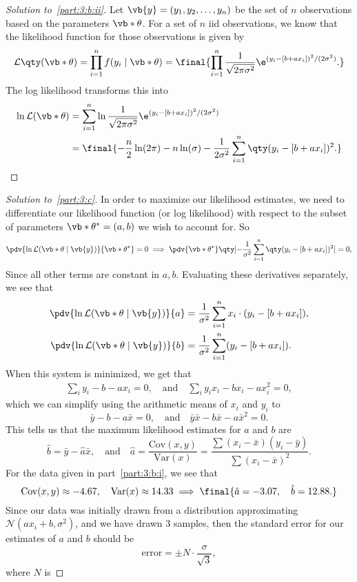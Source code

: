 \documentclass[10pt, physics]{homework}
\begin{document}
	\begin{proof}[Solution to~\ref{part:3:b:ii}]
		Let $\vb{y} = (y_1,y_2,\dots,y_n)$ be the set of $n$ observations based on the parameters $\vb*{\theta}$.
		For a set of $n$ iid observations, we know that the likelihood function for those observations is given by
		\[ \mathcal{L}\qty(\vb*{\theta}) = \prod_{i = 1}^n f(y_i \mid \vb*{\theta}) = \final{\prod_{i = 1}^n \frac{1}{\sqrt{2\pi\sigma^2}}\e^{(y_i-[b+ax_i])^2/(2\sigma^2)}.}\]
		The log likelihood transforms this into
		\begin{align*}
			\ln\mathcal{L}(\vb*{\theta}) &= \sum_{i = 1}^n \ln \frac{1}{\sqrt{2\pi\sigma^2}}\e^{(y_i-[b+ax_i])^2/(2\sigma^2)} \\
			& = \final{-\frac{n}{2}\ln(2\pi) - n\ln(\sigma) - \frac{1}{2\sigma^2}\sum_{i=1}^n\qty(y_i - [b + ax_i])^2.}\qedhere
		\end{align*}
	\end{proof}
	\begin{proof}[Solution to~\ref{part:3:c}]
		In order to maximize our likelihood estimates, we need to differentiate our likelihood function (or log likelihood) with respect to the subset of parameters $\vb*{\theta^*} = (a,b)$ we wish to account for.
		So
		\begin{align*}
			\pdv{\ln\mathcal{L}(\vb*{\theta} \mid \vb{y})}{\vb*{\theta^*}} = 0 \implies \pdv{\vb*{\theta^*}}\qty[-\frac{1}{\sigma^2}\sum_{i=1}^n \qty(y_i - [b + ax_i])^2] = 0,
		\end{align*}
		Since all other terms are constant in $a,b$.
		Evaluating these derivatives separately, we see that
		\begin{align*}
			\pdv{\ln\mathcal{L}(\vb*{\theta} \mid \vb{y})}{a} &= \frac{1}{\sigma^2}\sum_{i=1}^n x_i\cdot(y_i - [b + ax_i]), \\
			\pdv{\ln\mathcal{L}(\vb*{\theta} \mid \vb{y})}{b} &= \frac{1}{\sigma^2}\sum_{i=1}^n (y_i-[b+ax_i]).
		\end{align*}
		When this system is minimized, we get that
		\begin{align*}
			\sum_i y_i - b - ax_i = 0, \quad\text{and}\quad\sum_i y_ix_i - bx_i -ax_i^2 = 0,
		\end{align*}
		which we can simplify using the arithmetic means of $x_i$ and $y_i$ to 
		\[ \bar{y}-b-a\bar{x} = 0,\quad\text{and}\quad \bar{y}\bar{x}-b\bar{x}-a\bar{x}^2 = 0. \]
		This tells us that the maximum likelihood estimates for $a$ and $b$ are
		\[ \hat{b} = \bar{y} - \hat{a}\bar{x},\quad\text{and}\quad \hat{a} = \frac{\text{Cov}(x,y)}{\text{Var}(x)} = \frac{\sum (x_i-\bar{x})(y_i-\bar{y})}{\sum(x_i-\bar{x})^2}. \]
		For the data given in part~\ref{part:3:b:i}, we see that
		\[ \text{Cov}(x,y) \approx -4.67,\quad\text{Var}(x) \approx 14.33 \implies \final{\hat{a} = -3.07,\quad \hat{b} = 12.88.}\]
		Since our data was initially drawn from a distribution approximating $\mathcal{N}(ax_i+b,\sigma^2)$, and we have drawn 3 samples, then the standard error for our estimates of $a$ and $b$ should be 
		\[ \text{error} = \pm N\cdot\frac{\sigma}{\sqrt{3}}, \]
		where $N$ is 
	\end{proof}
\end{document}
